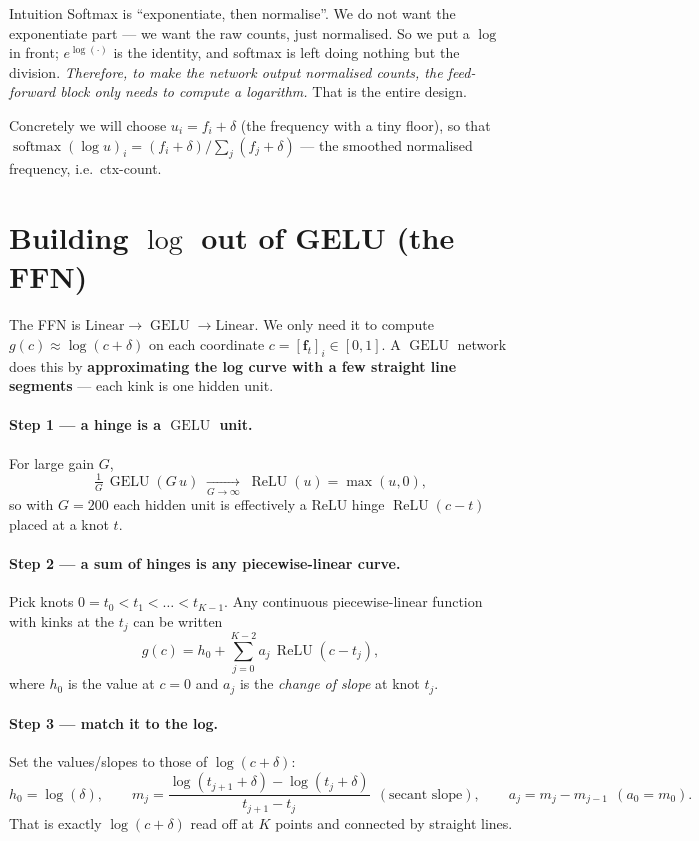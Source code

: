 \documentclass[11pt]{article}
\newcommand{\fvec}{\mathbf{f}}
\newcommand{\relu}{\operatorname{ReLU}}
\newcommand{\gelu}{\operatorname{GELU}}
\newcommand{\sm}{\operatorname{softmax}}
\begin{document}
\begin{keybox}{Intuition}
Softmax is ``exponentiate, then normalise''. We do not want the exponentiate part --- we want the raw
counts, just normalised. So we put a $\log$ in front; $e^{\log(\cdot)}$ is the identity, and softmax is
left doing nothing but the division. \emph{Therefore, to make the network output normalised counts, the
feed-forward block only needs to compute a logarithm.} That is the entire design.
\end{keybox}

Concretely we will choose $u_i=f_i+\delta$ (the frequency with a tiny floor), so that
$\sm(\log u)_i = (f_i+\delta)/\sum_j(f_j+\delta)$ --- the smoothed normalised frequency, i.e.\ ctx-count.

\section{Building $\log$ out of GELU (the FFN)}
The FFN is $\text{Linear}\to\gelu\to\text{Linear}$. We only need it to compute $g(c)\approx\log(c+\delta)$
on each coordinate $c=[\fvec_t]_i\in[0,1]$. A $\gelu$ network does this by \textbf{approximating the log
curve with a few straight line segments} --- each kink is one hidden unit.

\paragraph{Step 1 --- a hinge is a $\gelu$ unit.} For large gain $G$,
$$
\tfrac1G\,\gelu(G\,u)\;\xrightarrow[G\to\infty]{}\;\relu(u)=\max(u,0),
$$
so with $G=200$ each hidden unit is effectively a ReLU hinge $\relu(c-t)$ placed at a knot $t$.

\paragraph{Step 2 --- a sum of hinges is any piecewise-linear curve.} Pick knots
$0=t_0<t_1<\dots<t_{K-1}$. Any continuous piecewise-linear function with kinks at the $t_j$ can be written
$$
g(c)=h_0+\sum_{j=0}^{K-2} a_j\,\relu(c-t_j),
$$
where $h_0$ is the value at $c=0$ and $a_j$ is the \emph{change of slope} at knot $t_j$.

\paragraph{Step 3 --- match it to the log.} Set the values/slopes to those of $\log(c+\delta)$:
$$
h_0=\log(\delta),\qquad
m_j=\frac{\log(t_{j+1}+\delta)-\log(t_j+\delta)}{t_{j+1}-t_j}\ \ (\text{secant slope}),\qquad
a_j=m_j-m_{j-1}\ \ (a_0=m_0).
$$
That is exactly $\log(c+\delta)$ read off at $K$ points and connected by straight lines.
\end{document}
